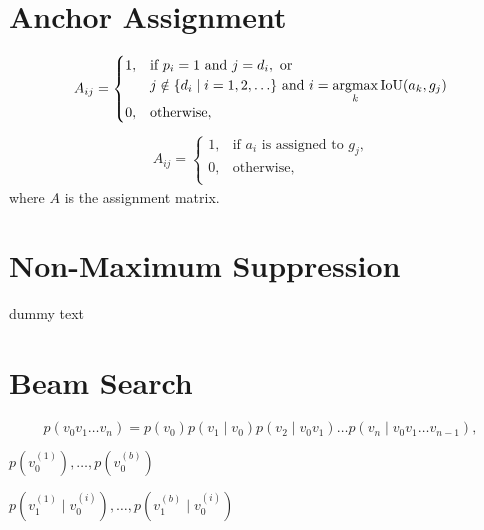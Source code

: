 \section{Anchor Assignment}\label{app:assignanchor}
\begin{equation}
\begin{aligned}
	A_{ij} = \begin{cases}
		1, & \text{if } p_i = 1 \text{ and } j = d_i, \text{ or }\\
		& j \notin \{d_i \mid i = 1,2,\ldots\} \text{ and } i = \operatorname*{argmax}\limits_{k} \text{IoU}(a_k, g_j) \\
		0, & \text{otherwise},\\
	\end{cases}
\end{aligned}
\end{equation}
\begin{equation}
\begin{aligned}
	A_{ij} = \begin{cases}
		1, & \text{if $a_i$ is assigned to $g_j$,}\\
		0, & \text{otherwise},\\
	\end{cases}
\end{aligned}
\end{equation}
where $A$ is the assignment matrix. 

\section{Non-Maximum Suppression}\label{app:nms}
dummy text


\section{Beam Search}\label{app:bmsrch}

\begin{equation}
	p(v_0v_1 \ldots v_n) = p(v_0)p(v_1 \mid v_0)p(v_2 \mid v_0v_1) \ldots p(v_n \mid v_0v_1 \ldots v_{n-1}),
\end{equation}

$p(v_0^{(1)}),\ldots,p(v_0^{(b)})$

$p(v_1^{(1)} \mid v_0^{(i)}),\ldots,p(v_1^{(b)} \mid v_0^{(i)})$


